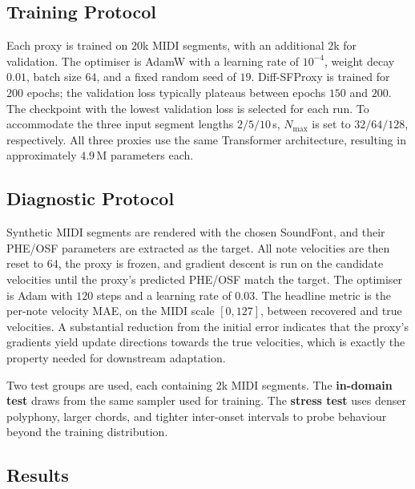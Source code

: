 \subsection{Training Protocol}
\label{ssec:bp:proxy_training_protocol}

Each proxy is trained on $20$k MIDI segments, with an additional $2$k for validation. The optimiser is AdamW with a learning rate of $10^{-4}$, weight decay $0.01$, batch size $64$, and a fixed random seed of $19$. Diff-SFProxy is trained for $200$ epochs; the validation loss typically plateaus between epochs $150$ and $200$. The checkpoint with the lowest validation loss is selected for each run. To accommodate the three input segment lengths $2/5/10$\,s, $N_{\max}$ is set to $32/64/128$, respectively. All three proxies use the same Transformer architecture, resulting in approximately $4.9$\,M parameters each.

\subsection{Diagnostic Protocol}
\label{ssec:bp:proxy_diagnostic_protocol}

Synthetic MIDI segments are rendered with the chosen SoundFont, and their PHE/OSF parameters are extracted as the target. All note velocities are then reset to $64$, the proxy is frozen, and gradient descent is run on the candidate velocities until the proxy's predicted PHE/OSF match the target. The optimiser is Adam with $120$ steps and a learning rate of $0.03$. The headline metric is the per-note velocity MAE, on the MIDI scale $[0, 127]$, between recovered and true velocities. A substantial reduction from the initial error indicates that the proxy's gradients yield update directions towards the true velocities, which is exactly the property needed for downstream adaptation.

Two test groups are used, each containing $2$k MIDI segments. The \textbf{in-domain test} draws from the same sampler used for training. The \textbf{stress test} uses denser polyphony, larger chords, and tighter inter-onset intervals to probe behaviour beyond the training distribution.

\subsection{Results}
\label{ssec:bp:proxy_results}

